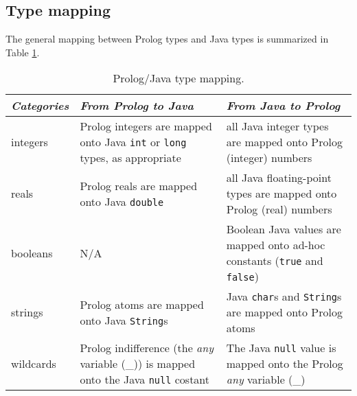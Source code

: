 \subsection{Type mapping}

The general mapping between Prolog types and Java types is summarized in Table \ref{tab:prolog-java-type-mapping}.

\begin{table}[h]
  \centering
  \begin{tabular}{|p{1.8cm}|p{4.7cm}|p{4.7cm}|}
  \hline
  \textit{Categories} & \textit{From Prolog to Java} & \textit{From Java to Prolog}\\
  \hline
  integers   & Prolog integers are mapped onto Java \texttt{int} or \texttt{long} types, as appropriate & all Java integer types are mapped onto Prolog (integer) numbers\\
  \hline
  reals      & Prolog reals are mapped onto Java \texttt{double} & all Java floating-point types are mapped onto Prolog (real) numbers\\
  \hline
  booleans   & N/A & Boolean Java values are mapped onto ad-hoc constants (\texttt{true} and \texttt{false})\\
  \hline
  strings    & Prolog atoms are mapped onto Java \texttt{String}s & Java \texttt{char}s and \texttt{String}s are mapped onto Prolog atoms\\
  \hline
  wildcards  & Prolog indifference (the \textit{any} variable (\_)) is mapped onto the Java \texttt{null} costant & The Java \texttt{null} value is mapped onto the Prolog \textit{any} variable (\_)\\
  \hline
  \end{tabular}
  \caption{Prolog/Java type mapping.}\label{tab:prolog-java-type-mapping}
\end{table}

